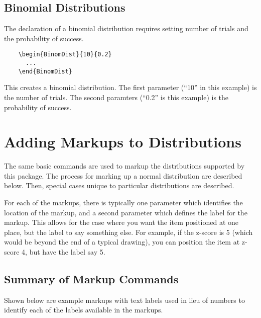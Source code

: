 \documentclass[11pt,letterpaper]{article}
\begin{document}
\subsection{Binomial Distributions}

The declaration of a binomial distribution requires setting number of
trials and the probability of success.

  \begin{minipage}{0.3\textwidth}
  \begin{lstlisting}
    \begin{BinomDist}{10}{0.2}
      ...
    \end{BinomDist}
  \end{lstlisting}
  \end{minipage}
  \begin{minipage}{0.6\textwidth}
    This creates a binomial distribution.  The first parameter
    (``10'' in this example) is the number of trials.  The second
    paramters (``0.2'' is this example) is the probability of
    success.
  \end{minipage}

\section{Adding Markups to Distributions}

The same basic commands are used to markup the distributions supported
by this package.  The process for marking up a normal distribution are
described below.  Then, special cases unique to particular
distributions are described.

For each of the markups, there is typically one parameter which
identifies the location of the markup, and a second parameter which
defines the label for the markup.  This allows for the case where you
want the item positioned at one place, but the label to say something
else.  For example, if the z-score is 5 (which would be beyond the end
of a typical drawing), you can position the item at z-score 4, but
have the label say 5.

\subsection{Summary of Markup Commands}

Shown below are example markups with text labels used in lieu of
numbers to identify each of the labels available in the markups.
\end{document}

